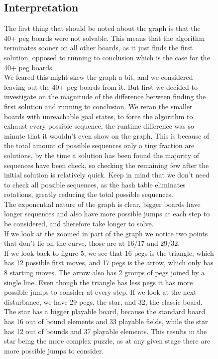 \documentclass[11pt]{article}
\begin{document}
\begin{figure}
\subsection{Interpretation}
The first thing that should be noted about the graph is that the 40+ peg boards were not solvable. This means that the algorithm terminates sooner on all other boards, as it just finds the first solution, opposed to running to conclusion which is the case for the 40+ peg boards.\\
We feared this might skew the graph a bit, and we considered leaving out the 40+ peg boards from it. But first we decided to investigate on the magnitude of the difference between finding the first solution and running to conclusion. We reran the smaller boards with unreachable goal states, to force the algorithm to exhaust every possible sequence, the runtime difference was so minute that it wouldn't even show on the graph. This is because of the total amount of possible sequences only a tiny fraction are solutions, by the time a solution has been found the majority of sequences have been check, so checking the remaining few after the initial solution is relatively quick. Keep in mind that we don't need to check all possible sequences, as the hash table eliminates rotations, greatly reducing the total possible sequences.\\
The exponential nature of the graph is clear, bigger boards have longer sequences and also have more possible jumps at each step to be considered, and therefore take longer to solve.\\
If we look at the zoomed in part of the graph we notice two points that don't lie on the curve, those are at 16/17 and 29/32.\\
If we look back to figure 5, we see that 16 pegs is the triangle, which has 12 possible first moves, and 17 pegs is the arrow, which only has 8 starting moves. The arrow also has 2 groups of pegs joined by a single line. Even though the triangle has less pegs it has more possible jumps to consider at every step.\newline
If we look at the next disturbance, we have 29 pegs, the star, and 32, the classic board. The star has a bigger playable board, because the standard board has 16 out of bound elements and 33 playable fields, while the star has 12 out of bounds and 37 playable elements. This results in the star being the more complex puzzle, as at any given stage there are more possible jumps to consider.\\
\end{figure}
\end{document}
